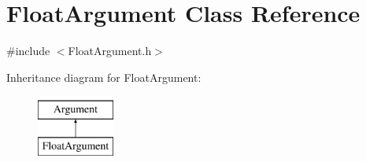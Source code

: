 \hypertarget{classFloatArgument}{\section{Float\-Argument Class Reference}
\label{classFloatArgument}
}


{\ttfamily \#include $<$Float\-Argument.\-h$>$}

Inheritance diagram for Float\-Argument\-:\begin{figure}[H]
\begin{center}
\leavevmode
\includegraphics[height=2.000000cm]{classFloatArgument}
\end{center}
\end{figure}

